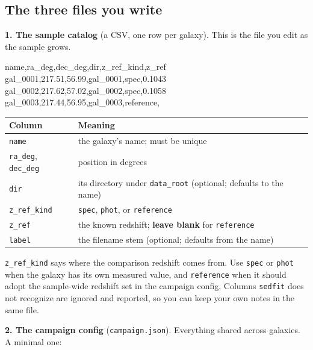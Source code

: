 \documentclass[11pt]{article}
\begin{document}
\subsection{The three files you write}

\textbf{1. The sample catalog} (a CSV, one row per galaxy). This is the
file you edit as the sample grows.

\begin{cmd}\ttfamily
name,ra\_deg,dec\_deg,dir,z\_ref\_kind,z\_ref\\
gal\_0001,217.51,56.99,gal\_0001,spec,0.1043\\
gal\_0002,217.62,57.02,gal\_0002,spec,0.1058\\
gal\_0003,217.44,56.95,gal\_0003,reference,
\end{cmd}

\begin{center}
\begin{tabular}{ll}
\toprule
\textbf{Column} & \textbf{Meaning} \\
\midrule
\texttt{name} & the galaxy's name; must be unique \\
\texttt{ra\_deg}, \texttt{dec\_deg} & position in degrees \\
\texttt{dir} & its directory under \texttt{data\_root} (optional; defaults to the name) \\
\texttt{z\_ref\_kind} & \texttt{spec}, \texttt{phot}, or \texttt{reference} \\
\texttt{z\_ref} & the known redshift; \textbf{leave blank} for \texttt{reference} \\
\texttt{label} & the filename stem (optional; defaults from the name) \\
\bottomrule
\end{tabular}
\end{center}

\texttt{z\_ref\_kind} says where the comparison redshift comes from.
Use \texttt{spec} or \texttt{phot} when the galaxy has its own measured
value, and \texttt{reference} when it should adopt the sample-wide
redshift set in the campaign config. Columns \texttt{sedfit} does not
recognize are ignored and reported, so you can keep your own notes in the
same file.

\textbf{2. The campaign config} (\texttt{campaign.json}). Everything
shared across galaxies. A minimal one:
\end{document}
